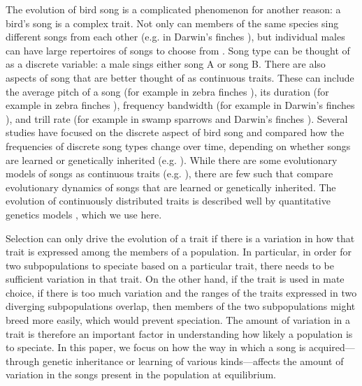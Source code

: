 \documentclass[12pt]{article}
\begin{document}
The evolution of bird song is a complicated phenomenon for another reason: a bird's song is a complex trait. Not only can members of the same species sing different songs from each other (e.g. in Darwin's finches \cite{Gibbs:1990fk}), but individual males can have large repertoires of songs to choose from  \cite{Devoogd:1993uq,Beecher:2005ly}. Song type can be thought of as a discrete variable: a male sings either song A or song B.  There are also aspects of song that are better thought of as continuous traits. These can include the average pitch of a song (for example in zebra finches \cite{Forstmeier:2009cr}), its duration (for example in zebra finches \cite{Forstmeier:2009cr}), frequency bandwidth (for example in Darwin's finches \cite{Podos:2001vn}), and trill rate (for example in swamp sparrows \cite{Ballentine:2004kx} and Darwin's finches \cite{Podos:2001vn}). Several studies have focused on the discrete aspect of bird song and compared how the frequencies of discrete song types change over time, depending on whether songs are learned or genetically inherited (e.g. \cite{Lachlan:2004tg,Verzijden:2005vn,Yeh:2015bh}).  While there are some evolutionary models of songs as continuous traits (e.g. \cite{Aoki:2001ly}), there are few such that compare evolutionary dynamics of songs that are learned or genetically inherited. The evolution of continuously distributed traits is described well by quantitative genetics models \cite{Lande:1980zr,Lande:1981fk,Mead:2004uq}, which we use here. 


Selection can only drive the evolution of a trait if there is a variation in how that trait is expressed among the members of a population. In particular, in order for two subpopulations to speciate based on a particular trait, there needs to be sufficient variation in that trait. On the other hand, if the trait is used in mate choice, if there is too much variation and the ranges of the traits expressed in two diverging subpopulations overlap, then members of the two subpopulations might breed more easily, which would prevent speciation. The amount of variation in a trait is therefore an important factor in understanding how likely a population is to speciate. In this paper, we focus on how the way in which a song is acquired---through genetic inheritance or learning of various kinds---affects the amount of variation in the songs present in the population at equilibrium.
\end{document}
